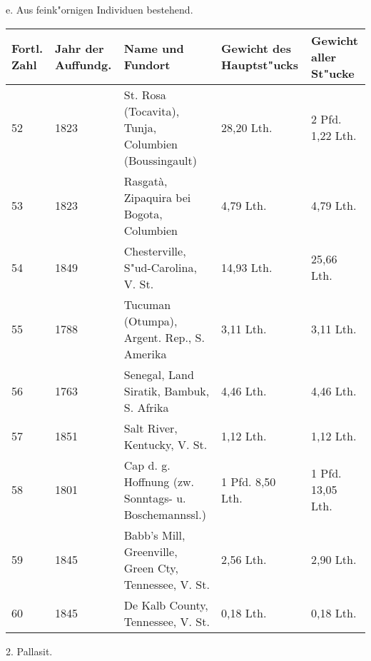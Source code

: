 \documentclass[a4paper, 11pt, oneside, german]{article}
\begin{document}
\clearpage
\begin{center}
e. Aus feink"ornigen Individuen bestehend.
\end{center}
\begin{center}
\begin{footnotesize}
\begin{tabular}{ |p{7mm}|p{9mm}|p{45mm}|p{24mm}|p{24mm}| }
    \hline
    Fortl. Zahl & Jahr der Auffundg. & Name und Fundort & Gewicht des Hauptst"ucks & Gewicht aller St"ucke\\
    \hline\hline
    52 & 1823 & St. Rosa (Tocavita), Tunja, Columbien (Boussingault) & 28,20 Lth. & 2 Pfd. 1,22 Lth.\\\hline
    53 & 1823 & Rasgatà, Zipaquira bei Bogota, Columbien & 4,79 Lth. & 4,79 Lth.\\\hline
    54 & 1849 & Chesterville, S"ud-Carolina, V. St. & 14,93 Lth. & 25,66 Lth.\\\hline
    55 & 1788 & Tucuman (Otumpa), Argent. Rep., S. Amerika & 3,11 Lth. & 3,11 Lth.\\\hline
    56 & 1763 & Senegal, Land Siratik, Bambuk, S. Afrika & 4,46 Lth. & 4,46 Lth.\\\hline
    57 & 1851 & Salt River, Kentucky, V. St. & 1,12 Lth. & 1,12 Lth.\\\hline
    58 & 1801 & Cap d. g. Hoffnung (zw. Sonntags- u. Boschemannssl.) & 1 Pfd. 8,50 Lth. & 1 Pfd. 13,05 Lth.\\\hline
    59 & 1845 & Babb's Mill, Greenville, Green Cty, Tennessee, V. St. & 2,56 Lth. & 2,90 Lth.\\\hline
    60 & 1845 & De Kalb County, Tennessee, V. St. & 0,18 Lth. & 0,18 Lth.\\
    \hline
\end{tabular}
\end{footnotesize}
\end{center}
\clearpage
\begin{center}
2. Pallasit.
\end{center}
\end{document}
